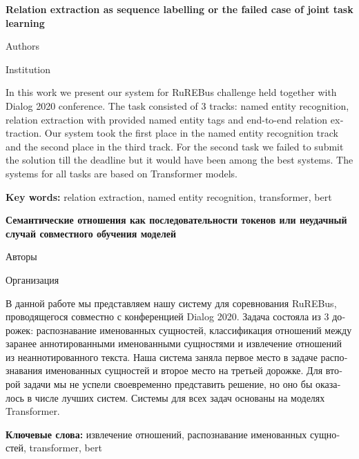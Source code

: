\documentclass{dialogue}
\begin{document}
\begin{otherlanguage}{english}
\begin{center}
{\Large\bfseries{Relation extraction as sequence labelling or the failed case of joint task learning}}

\medskip

Authors

\medskip

Institution
\end{center}

In this work we present our system for RuREBus challenge held together with Dialog 2020 conference. The task consisted of 3 tracks: named entity recognition, relation extraction with provided named entity tags and end-to-end relation extraction. Our system took the first place in the named entity recognition track and the second place in the third track. For the second task we failed to submit the solution till the deadline but it would have been among the best systems. The systems for all tasks are based on Transformer models.

\textbf{Key words:} relation extraction, named entity recognition, transformer, bert
\end{otherlanguage}

\bigskip

\begin{otherlanguage}{russian}
\begin{center}
{\Large\bfseries{Семантические отношения как последовательности токенов или неудачный случай совместного обучения моделей}}

\medskip

Авторы

\medskip

Организация
\end{center}

В данной работе мы представляем нашу систему для соревнования RuREBus, проводящегося совместно с конференцией Dialog 2020. Задача состояла из 3 дорожек: распознавание именованных сущностей, классификация отношений между заранее аннотированными именованными сущностями и извлечение отношений из неаннотированного текста. Наша система заняла первое место в задаче распознавания именованных сущностей и второе место на третьей дорожке. Для второй задачи мы не успели своевременно представить решение, но оно бы оказалось в числе лучших систем. Системы для всех задач основаны на моделях Transformer.
\medskip

\textbf{Ключевые слова:} извлечение отношений, распознавание именованных сущностей, transformer, bert
\end{otherlanguage}
\end{document}
